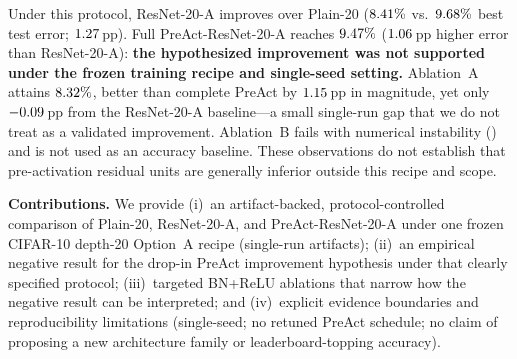 Under this protocol, ResNet-20-A improves over Plain-20
($8.41\%$ vs.\ $9.68\%$ best test error; $1.27$\,pp).
Full PreAct-ResNet-20-A reaches $9.47\%$
($1.06$\,pp higher error than ResNet-20-A):
\textbf{the hypothesized improvement was not supported under the frozen training recipe and
single-seed setting.}
Ablation~A attains $8.32\%$, better than complete PreAct by
$1.15$\,pp in magnitude, yet only
$-0.09$\,pp from the ResNet-20-A baseline---a small single-run gap that we
do not treat as a validated improvement.
Ablation~B fails with numerical instability (\AblationBStatus) and is not used as an accuracy
baseline.
These observations do not establish that pre-activation residual units are generally inferior
outside this recipe and scope.

\textbf{Contributions.}
We provide (i)~an artifact-backed, protocol-controlled comparison of Plain-20, ResNet-20-A, and
PreAct-ResNet-20-A under one frozen CIFAR-10 depth-20 Option~A recipe (single-run artifacts);
(ii)~an empirical negative result for the drop-in PreAct improvement hypothesis under that
clearly specified protocol;
(iii)~targeted BN+ReLU ablations that narrow how the negative result can be interpreted; and
(iv)~explicit evidence boundaries and reproducibility limitations (single-seed; no retuned
PreAct schedule; no claim of proposing a new architecture family or leaderboard-topping
accuracy).
